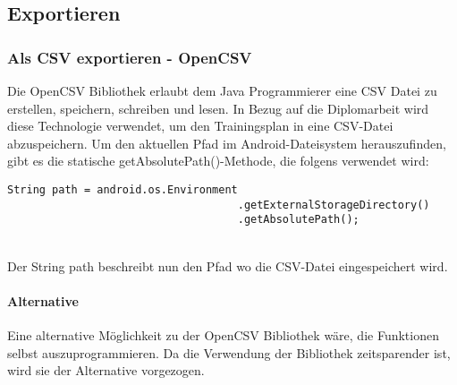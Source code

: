 \documentclass[FIPLY_base.tex]{subfiles}
\begin{document}
\subsection{Exportieren}
\subsubsection{Als CSV exportieren - OpenCSV}
Die OpenCSV Bibliothek erlaubt dem Java Programmierer eine CSV Datei zu erstellen, speichern, schreiben und lesen.
In Bezug auf die Diplomarbeit wird diese Technologie verwendet, um den Trainingsplan in eine CSV-Datei abzuspeichern.
Um den aktuellen Pfad im Android-Dateisystem herauszufinden, gibt es die statische getAbsolutePath()-Methode, die folgens verwendet wird:
\begin{lstlisting}[caption={Methode, um den aktuellen Pfad herauszufinden.},label=DescriptiveLabel]
	String path = android.os.Environment
									.getExternalStorageDirectory()
									.getAbsolutePath();
\end{lstlisting}
\ \\
Der String \grqq{}path\grqq{} beschreibt nun den Pfad wo die CSV-Datei eingespeichert wird.

\paragraph{Alternative}
Eine alternative Möglichkeit zu der OpenCSV Bibliothek wäre, die Funktionen selbst auszuprogrammieren. Da die Verwendung der Bibliothek zeitsparender ist, wird sie der Alternative vorgezogen.
\end{document}
